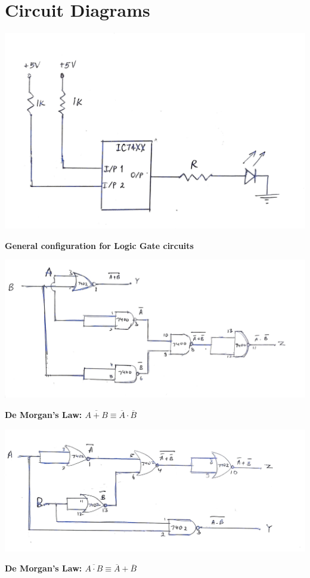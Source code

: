 \section{Circuit Diagrams}
\begin{center}
    \includegraphics[scale = 0.11]{Documents/logicgate_1.jpg}
\end{center}
\begin{center}
    \textbf{General configuration for Logic Gate circuits}
\end{center}
\begin{center}
    \includegraphics[scale = 0.16]{Documents/demorgans1_1.jpg}
\end{center}
\begin{center}
    \textbf{De Morgan's Law: $\overline{A + B} \equiv \overline{A} \cdot \overline{B}$}
\end{center}
\begin{center}
    \includegraphics[scale = 0.16]{Documents/demorgans2_1.jpg}
\end{center}
\begin{center}
    \textbf{De Morgan's Law: $\overline{A \cdot B} \equiv \overline{A} + \overline{B}$}
\end{center}
